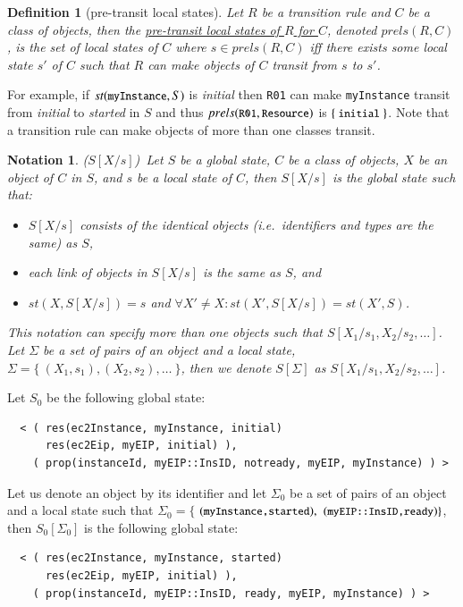 \documentclass[12pt]{report}
\newtheorem{notation}{Notation}
\newtheorem{definition}{Definition}
\newcommand{\mbstt}[1]{\mbox{\small{\tt {#1}}}}
\newcommand{\stt}[1]{{\small{\tt {#1}}}}
\newcommand{\ul}{\underline}
\begin{document}
\begin{definition}[pre-transit local states]
Let $R$ be a transition rule and $C$ be a class of objects, then
the \ul{pre-transit local states of $R$ for $C$}, denoted
\ul{$prels(R,C)$}, is the set of local states of $C$ where $s \in
prels(R,C)$ iff there exists some local state $s'$ of $C$ such that
$R$ can make objects of $C$ transit from $s$ to $s'$.
\end{definition}
For example, if $st(\mbstt{myInstance},S)$ is {\it initial} then
\stt{R01} can make \stt{myInstance} transit from {\it initial} to {\it
  started} in $S$ and thus $prels(\mbstt{R01},\mbstt{Resource})$ is
$\{~\mbstt{initial}~\}$. Note that a transition rule can make objects
of more than one classes transit.

\begin{notation}($S[X/s]$)\
Let $S$ be a global state, $C$ be a class of objects, $X$ be an object
of $C$ in $S$, and $s$ be a local state of $C$, then
\ul{$S[X/s]$} is the global state such that:
\begin{itemize}
\item $S[X/s]$ consists of the identical objects (i.e.\ identifiers and
  types are the same) as $S$,
\item each link of objects in $S[X/s]$ is the same as $S$, and
\item $st(X,S[X/s])=s$ and $\forall X'\ne X:st(X',S[X/s])=st(X',S)$.
\end{itemize}
This notation can specify more than one objects such that
\ul{$S[X_1/s_1,X_2/s_2,\dots]$}.  Let $\Sigma$ be a set of pairs of
an object and a local state, $\Sigma = \{~ (X_1,s_1), (X_2,s_2), \dots~\}$,
then we denote \ul{$S[\Sigma]$} as $S[X_1/s_1,X_2/s_2,\dots]$.
\end{notation}
Let $S_0$ be the following global state:
\small
\begin{verbatim}
  < ( res(ec2Instance, myInstance, initial)
      res(ec2Eip, myEIP, initial) ),
    ( prop(instanceId, myEIP::InsID, notready, myEIP, myInstance) ) >
\end{verbatim}
\normalsize
Let us denote an object by its identifier and let $\Sigma_0$ be a set
of pairs of an object and a local state such that $\Sigma_0=\{$
$(\mbstt{myInstance,started}),$ $(\mbstt{myEIP::InsID,ready})\}$, then
$S_0[\Sigma_0]$ is the following global state:
\small
\begin{verbatim}
  < ( res(ec2Instance, myInstance, started)
      res(ec2Eip, myEIP, initial) ),
    ( prop(instanceId, myEIP::InsID, ready, myEIP, myInstance) ) >
\end{verbatim}
\normalsize
\end{document}
